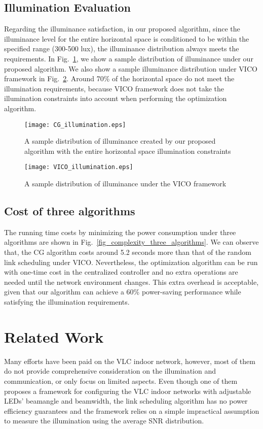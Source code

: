 \documentclass[10pt,journal]{IEEEtran}
\begin{document}
\subsection{Illumination Evaluation}
Regarding the illuminance satisfaction, in our proposed algorithm, since the illuminance level for the entire horizontal space is conditioned to be within the specified range (300-500 lux), the illuminance distribution always meets the requirements. In Fig.~\ref{fig_CG_illumination}, we show a sample distribution of illuminance under our proposed algorithm. We also show a sample illuminance distribution under VICO framework in Fig.~\ref{fig_VICO_illumination}. Around 70\% of the horizontal space do not meet the illumination requirements, because VICO framework does not take the illumination constraints into account when performing the optimization algorithm.

\begin{figure}
\centering
\texttt{[image: CG\_illumination.eps]}
\caption{A sample distribution of illuminance created by our proposed algorithm with the entire horizontal space illumination constraints}
\vspace{-7pt}
\label{fig_CG_illumination}
\end{figure}

\begin{figure}
\centering
\texttt{[image: VICO\_illumination.eps]}
\caption{A sample distribution of illuminance under the VICO framework}
\vspace{-7pt}
\label{fig_VICO_illumination}
\end{figure}

\subsection{Cost of three algorithms}
The running time costs by minimizing the power consumption under three algorithms are shown in Fig.~\ref{fig_complexity_three_algorithms}. We can observe that, the CG algorithm costs around 5.2 seconds more than that of the random link scheduling under VICO. Nevertheless, the optimization algorithm can be run with one-time cost in the centralized controller and no extra operations are needed until the network environment changes. This extra overhead is acceptable, given that our algorithm can achieve a 60\% power-saving performance while satisfying the illumination requirements.

\section{Related Work}\label{related_work}
Many efforts have been paid on the VLC indoor network, however, most of them do not provide comprehensive consideration on the illumination and communication, or only focus on limited aspects. Even though one of them \cite{li2012vico} proposes a framework for configuring the VLC indoor networks with adjustable LEDs’ beamangle and beamwidth, the link scheduling algorithm has no power efficiency guarantees and the framework relies on a simple impractical assumption to measure the illumination using the average SNR distribution.
\end{document}
